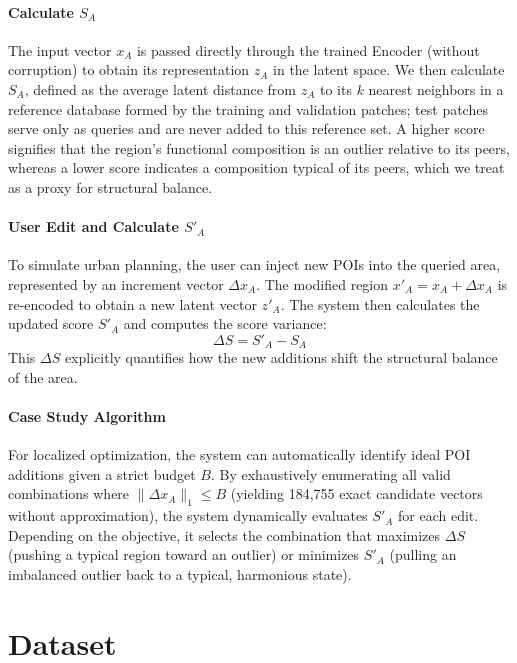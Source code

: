 \documentclass[sigconf]{acmart}
\begin{document}
\paragraph{Calculate $S_A$}
The input vector $x_A$ is passed directly through the trained Encoder (without corruption) to obtain its representation $z_A$ in the latent space. We then calculate $S_A$, defined as the average latent distance from $z_A$ to its $k$ nearest neighbors in a reference database formed by the training and validation patches; test patches serve only as queries and are never added to this reference set. A higher score signifies that the region's functional composition is an outlier relative to its peers, whereas a lower score indicates a composition typical of its peers, which we treat as a proxy for structural balance.

\paragraph{User Edit and Calculate $S'_A$}
To simulate urban planning, the user can inject new POIs into the queried area, represented by an increment vector $\Delta x_A$. The modified region $x'_A = x_A + \Delta x_A$ is re-encoded to obtain a new latent vector $z'_A$. The system then calculates the updated score $S'_A$ and computes the score variance:
\begin{equation}
\Delta S = S'_A - S_A
\end{equation}
This $\Delta S$ explicitly quantifies how the new additions shift the structural balance of the area.

\paragraph{Case Study Algorithm}
For localized optimization, the system can automatically identify ideal POI additions given a strict budget $B$. By exhaustively enumerating all valid combinations where $\lVert\Delta x_A\rVert_1 \le B$ (yielding 184,755 exact candidate vectors without approximation), the system dynamically evaluates $S'_A$ for each edit. Depending on the objective, it selects the combination that maximizes $\Delta S$ (pushing a typical region toward an outlier) or minimizes $S'_A$ (pulling an imbalanced outlier back to a typical, harmonious state).

\section{Dataset}
\end{document}

